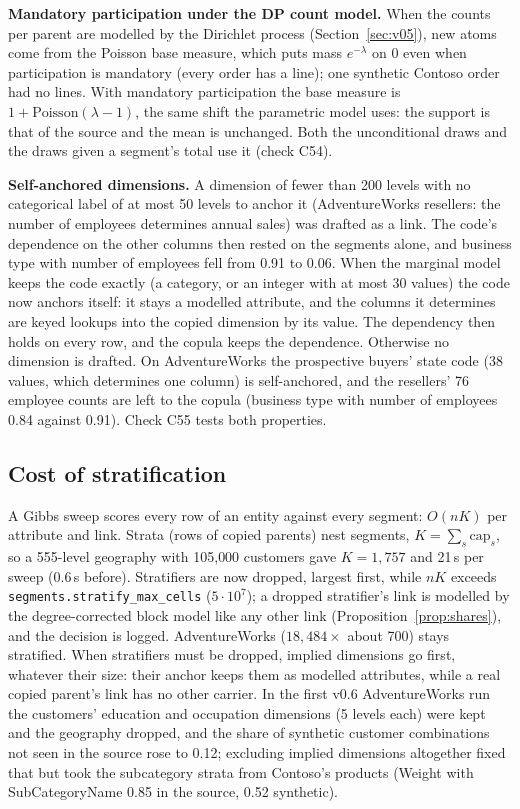 \noindent\textbf{Mandatory participation under the DP count model.} When the counts per parent are modelled by the Dirichlet process (Section~\ref{sec:v05}), new atoms come from the Poisson base measure, which puts mass $e^{-\lambda}$ on 0 even when participation is mandatory (every order has a line); one synthetic Contoso order had no lines. With mandatory participation the base measure is $1+\mathrm{Poisson}(\lambda-1)$, the same shift the parametric model uses: the support is that of the source and the mean is unchanged. Both the unconditional draws and the draws given a segment's total use it (check C54).

\noindent\textbf{Self-anchored dimensions.} A dimension of fewer than 200 levels with no categorical label of at most 50 levels to anchor it (AdventureWorks resellers: the number of employees determines annual sales) was drafted as a link. The code's dependence on the other columns then rested on the segments alone, and business type with number of employees fell from 0.91 to 0.06. When the marginal model keeps the code exactly (a category, or an integer with at most 30 values) the code now anchors itself: it stays a modelled attribute, and the columns it determines are keyed lookups into the copied dimension by its value. The dependency then holds on every row, and the copula keeps the dependence. Otherwise no dimension is drafted. On AdventureWorks the prospective buyers' state code (38 values, which determines one column) is self-anchored, and the resellers' 76 employee counts are left to the copula (business type with number of employees 0.84 against 0.91). Check C55 tests both properties.

\subsection{Cost of stratification}
A Gibbs sweep scores every row of an entity against every segment: $O(nK)$ per attribute and link. Strata (rows of copied parents) nest segments, $K=\sum_s\mathrm{cap}_s$, so a 555-level geography with 105{,}000 customers gave $K=1{,}757$ and 21\,s per sweep (0.6\,s before). Stratifiers are now dropped, largest first, while $nK$ exceeds \texttt{segments.stratify\_max\_cells} ($5\cdot10^7$); a dropped stratifier's link is modelled by the degree-corrected block model like any other link (Proposition~\ref{prop:shares}), and the decision is logged. AdventureWorks ($18{,}484\times$ about 700) stays stratified. When stratifiers must be dropped, implied dimensions go first, whatever their size: their anchor keeps them as modelled attributes, while a real copied parent's link has no other carrier. In the first v0.6 AdventureWorks run the customers' education and occupation dimensions (5 levels each) were kept and the geography dropped, and the share of synthetic customer combinations not seen in the source rose to 0.12; excluding implied dimensions altogether fixed that but took the subcategory strata from Contoso's products (Weight with SubCategoryName 0.85 in the source, 0.52 synthetic).
